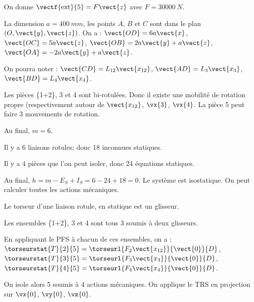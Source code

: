 On donne $\vectf{\text{ext}}{5} = F\vect{z}$ avec $F = \SI{30000}{N}$.

La dimension $a=\SI{400}{mm}$, les points $A$, $B$ et $C$ sont dans le plan $\left(O,\vect{y},\vect{z}\right)$.
On a : $\vect{OD} = 6a\vect{x}$, $\vect{OC} = 5a\vect{z}$, $\vect{OB} = 2a\vect{y}+a\vect{z}$, $\vect{OA} = - 2a\vect{y}+a\vect{z}$. 

On pourra noter : $\vect{CD} = L_{12}\vect{x_{12}}$, $\vect{AD} = L_3\vect{x_3}$, $\vect{BD} = L_4\vect{x_4}$.
\fi

\ifprof
\begin{corrige}
Les pièces \{1+2\}, 3 et 4 sont bi-rotulées. Donc il existe une mobilité de rotation propre (respectivement autour de $\vect{x_{12}}$, $\vx{3}$, $\vx{4}$.
La pièce 5 peut faire 3 mouvements de rotation.

Au final, $m=6$.

Il y a 6 liaisons rotules; donc 18 inconnues statiques. 

Il y a 4 pièces que l'on peut isoler, donc 24 équations statiques. 

Au final, $h = m-E_S+I_S = 6 -24 + 18 = 0$. Le système est isostatique. On peut calculer toutes les actions mécaniques.

\vspace{.5cm}

Le torseur d'une liaison rotule, en statique est un glisseur. 

Les ensembles \{1+2\}, 3 et 4 sont tous 3 soumis à deux glisseurs. 

En appliquant le PFS à chacun de ces ensembles, on a : 
$\torseurstat{T}{2}{5} = \torseurl{F_2\vect{x_{12}}}{\vect{0}}{D}$,
$\torseurstat{T}{3}{5} = \torseurl{F_3\vect{x_3}}{\vect{0}}{D}$,
$\torseurstat{T}{4}{5} = \torseurl{F_4\vect{x_4}}{\vect{0}}{D}$.

On isole alors 5 soumis à 4 actions mécaniques. 
On applique le TRS en projection sur $\vx{0}$, $\vy{0}$, $\vz{0}$. 
\end{corrige}
\else
\fi


